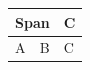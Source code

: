 \begin{tabular}{lll}
\toprule
\multicolumn{2}{c}{Span} & C \\
\midrule
A & B & C \\
\bottomrule
\end{tabular}
